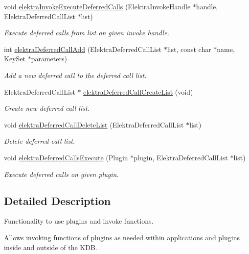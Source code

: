 \begin{DoxyCompactItemize}
void \hyperlink{group__invoke_ga933ae8c38aadef6af1462297fcfb5041}{elektra\+Invoke\+Execute\+Deferred\+Calls} (Elektra\+Invoke\+Handle $\ast$handle, Elektra\+Deferred\+Call\+List $\ast$list)
\begin{DoxyCompactList}\small\item\em Execute deferred calls from list on given invoke handle. \end{DoxyCompactList}\item 
int \hyperlink{group__invoke_gaa6200aa148a20b58d62cd8cc73f293ce}{elektra\+Deferred\+Call\+Add} (Elektra\+Deferred\+Call\+List $\ast$list, const char $\ast$name, Key\+Set $\ast$parameters)
\begin{DoxyCompactList}\small\item\em Add a new deferred call to the deferred call list. \end{DoxyCompactList}\item 
Elektra\+Deferred\+Call\+List $\ast$ \hyperlink{group__invoke_gacff96e795f6fc2fad61ed2f8a5cd80cb}{elektra\+Deferred\+Call\+Create\+List} (void)
\begin{DoxyCompactList}\small\item\em Create new deferred call list. \end{DoxyCompactList}\item 
void \hyperlink{group__invoke_ga7b9d8b37ebd5205fded885164d3ad6b7}{elektra\+Deferred\+Call\+Delete\+List} (Elektra\+Deferred\+Call\+List $\ast$list)
\begin{DoxyCompactList}\small\item\em Delete deferred call list. \end{DoxyCompactList}\item 
void \hyperlink{group__invoke_gad59c673dce3c2f08fbe52c5c667f55ce}{elektra\+Deferred\+Calls\+Execute} (Plugin $\ast$plugin, Elektra\+Deferred\+Call\+List $\ast$list)
\begin{DoxyCompactList}\small\item\em Execute deferred calls on given plugin. \end{DoxyCompactList}\end{DoxyCompactItemize}


\subsection{Detailed Description}
Functionality to use plugins and invoke functions. 

Allows invoking functions of plugins as needed within applications and plugins inside and outside of the K\+DB.

